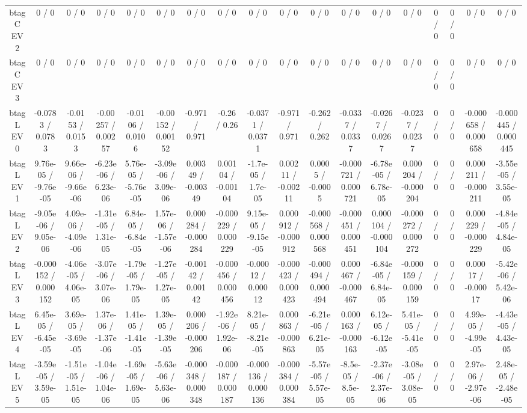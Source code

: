 \documentclass[10pt]{article}
\begin{document}
\begin{table}[htbp]
\begin{center}
\begin{tabular}{|c|c|c|c|c|c|c|c|c|c|c|c|c|c|c|c|c|c|}
  btag C EV 2 & 0 / 0 & 0 / 0 & 0 / 0 & 0 / 0 & 0 / 0 & 0 / 0 & 0 / 0 & 0 / 0 & 0 / 0 & 0 / 0 & 0 / 0 & 0 / 0 & 0 / 0 & 0 / 0 & 0 / 0 & 0 / 0 & 0 / 0 \\ 
  btag C EV 3 & 0 / 0 & 0 / 0 & 0 / 0 & 0 / 0 & 0 / 0 & 0 / 0 & 0 / 0 & 0 / 0 & 0 / 0 & 0 / 0 & 0 / 0 & 0 / 0 & 0 / 0 & 0 / 0 & 0 / 0 & 0 / 0 & 0 / 0 \\ 
  btag L EV 0 & -0.0783 / 0.0783 & -0.0153 / 0.0153 & -0.00257 / 0.00257 & -0.0106 / 0.0106 & -0.00152 / 0.00152 & -0.971 / 0.971 & -0.26 / 0.26 & -0.0371 / 0.0371 & -0.971 / 0.971 & -0.262 / 0.262 & -0.0337 / 0.0337 & -0.0267 / 0.0267 & -0.0237 / 0.0237 & 0 / 0 & 0 / 0 & -0.000658 / 0.000658 & -0.000445 / 0.000445 \\ 
  btag L EV 1 & 9.76e-05 / -9.76e-05 & 9.66e-06 / -9.66e-06 & -6.23e-06 / 6.23e-06 & 5.76e-05 / -5.76e-05 & -3.09e-06 / 3.09e-06 & 0.00349 / -0.00349 & 0.00104 / -0.00104 & -1.7e-05 / 1.7e-05 & 0.00211 / -0.00211 & 0.0005 / -0.0005 & -0.000721 / 0.000721 & -6.78e-05 / 6.78e-05 & 0.000204 / -0.000204 & 0 / 0 & 0 / 0 & 0.000211 / -0.000211 & -3.55e-05 / 3.55e-05 \\ 
  btag L EV 2 & -9.05e-06 / 9.05e-06 & 4.09e-06 / -4.09e-06 & -1.31e-05 / 1.31e-05 & 6.84e-05 / -6.84e-05 & 1.57e-06 / -1.57e-06 & 0.000284 / -0.000284 & -0.000229 / 0.000229 & 9.15e-05 / -9.15e-05 & 0.000912 / -0.000912 & -0.000568 / 0.000568 & -0.000451 / 0.000451 & 0.000104 / -0.000104 & -0.000272 / 0.000272 & 0 / 0 & 0 / 0 & 0.000229 / -0.000229 & -4.84e-05 / 4.84e-05 \\ 
  btag L EV 3 & -0.000152 / 0.000152 & -4.06e-05 / 4.06e-05 & -3.07e-06 / 3.07e-06 & -1.79e-05 / 1.79e-05 & -1.27e-05 / 1.27e-05 & -0.00142 / 0.00142 & -0.000456 / 0.000456 & -0.00012 / 0.00012 & -0.000423 / 0.000423 & -0.000494 / 0.000494 & 0.000467 / -0.000467 & -6.84e-05 / 6.84e-05 & -0.000159 / 0.000159 & 0 / 0 & 0 / 0 & 0.00017 / -0.00017 & -5.42e-06 / 5.42e-06 \\ 
  btag L EV 4 & 6.45e-05 / -6.45e-05 & 3.69e-05 / -3.69e-05 & 1.37e-06 / -1.37e-06 & 1.41e-05 / -1.41e-05 & 1.39e-05 / -1.39e-05 & 0.000206 / -0.000206 & -1.92e-06 / 1.92e-06 & 8.21e-05 / -8.21e-05 & 0.000863 / -0.000863 & -6.21e-05 / 6.21e-05 & 0.000163 / -0.000163 & 6.12e-05 / -6.12e-05 & 5.41e-05 / -5.41e-05 & 0 / 0 & 0 / 0 & 4.99e-05 / -4.99e-05 & -4.43e-05 / 4.43e-05 \\ 
  btag L EV 5 & -3.59e-05 / 3.59e-05 & -1.51e-05 / 1.51e-05 & -1.04e-06 / 1.04e-06 & -1.69e-05 / 1.69e-05 & -5.63e-06 / 5.63e-06 & -0.000348 / 0.000348 & -0.000187 / 0.000187 & -0.000136 / 0.000136 & -0.000384 / 0.000384 & -5.57e-05 / 5.57e-05 & -8.5e-05 / 8.5e-05 & -2.37e-06 / 2.37e-06 & -3.08e-05 / 3.08e-05 & 0 / 0 & 0 / 0 & 2.97e-06 / -2.97e-06 & 2.48e-05 / -2.48e-05 \\ 

\end{tabular}
\end{center}
\end{table}
\end{document}
